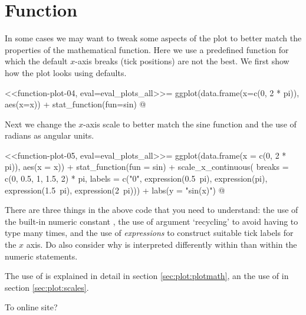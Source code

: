 
\section{Function}

\begin{explainbox}
In some cases we may want to tweak some aspects of the plot to better match the properties of the mathematical function. Here we use a predefined function for which the default $x$-axis breaks (tick positions) are not the best. We first show how the plot looks using defaults.

<<function-plot-04, eval=eval_plots_all>>=
ggplot(data.frame(x=c(0, 2 * pi)), aes(x=x)) +
  stat_function(fun=sin)
@

Next we change the $x$-axis scale to better match the sine function and the use of radians as angular units.

<<function-plot-05, eval=eval_plots_all>>=
ggplot(data.frame(x = c(0, 2 * pi)), aes(x = x)) +
  stat_function(fun = sin) +
  scale_x_continuous(
    breaks = c(0, 0.5, 1, 1.5, 2) * pi,
    labels = c("0", expression(0.5~pi), expression(pi),
             expression(1.5~pi), expression(2~pi))) +
  labs(y = "sin(x)")
@

There are three things in the above code that you need to understand: the use of the \Rlang built-in numeric constant , the use of argument `recycling' to avoid having to type  many times, and the use of \Rlang \emph{expressions} to construct suitable tick labels for the $x$ axis. Do also consider why  is interpreted differently within  than within the numeric statements.

The use of  is explained in detail in section \ref{sec:plot:plotmath}, an the use of  in section \ref{sec:plot:scales}.

\end{explainbox}

To online site?

